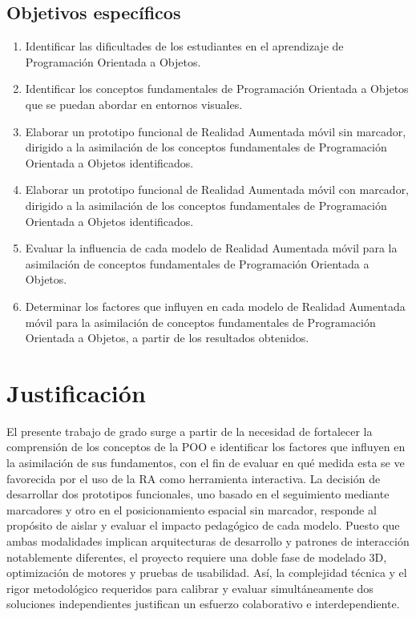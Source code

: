 \subsection{Objetivos específicos}
\begin{enumerate}
    \item Identificar las dificultades de los estudiantes en el aprendizaje de
          Programación Orientada a Objetos.
    \item Identificar los conceptos fundamentales de Programación Orientada a 
          Objetos que se puedan abordar en entornos visuales.
    \item Elaborar un prototipo funcional de Realidad Aumentada móvil sin 
          marcador, dirigido a la asimilación de los conceptos fundamentales de 
          Programación Orientada a Objetos identificados.
    \item Elaborar un prototipo funcional de Realidad Aumentada móvil con 
          marcador, dirigido a la asimilación de los conceptos fundamentales de  
          Programación Orientada a Objetos identificados.
    \item Evaluar la influencia de cada modelo de Realidad Aumentada móvil para 
          la asimilación de conceptos fundamentales de  Programación Orientada a 
          Objetos.
    \item Determinar los factores que influyen en cada modelo de Realidad 
          Aumentada móvil para la asimilación de conceptos fundamentales de 
          Programación Orientada a Objetos, a partir de los resultados obtenidos.
\end{enumerate}

\section{Justificación}
El presente trabajo de grado surge a partir de la necesidad de fortalecer la 
comprensión de los conceptos de la POO e identificar los factores que 
influyen en la asimilación de sus fundamentos, con el fin de evaluar en qué 
medida esta se ve favorecida por el uso de la RA como herramienta interactiva. 
La decisión de desarrollar dos prototipos funcionales, uno basado en el 
seguimiento mediante marcadores y otro en el posicionamiento espacial sin 
marcador, responde al propósito de aislar y evaluar el impacto pedagógico de 
cada modelo. Puesto que ambas modalidades implican arquitecturas de 
desarrollo y patrones de interacción notablemente diferentes, el proyecto 
requiere una doble fase de modelado 3D, optimización de motores y pruebas de 
usabilidad. Así, la complejidad técnica y el rigor metodológico requeridos 
para calibrar y evaluar simultáneamente dos soluciones independientes 
justifican un esfuerzo colaborativo e interdependiente.

